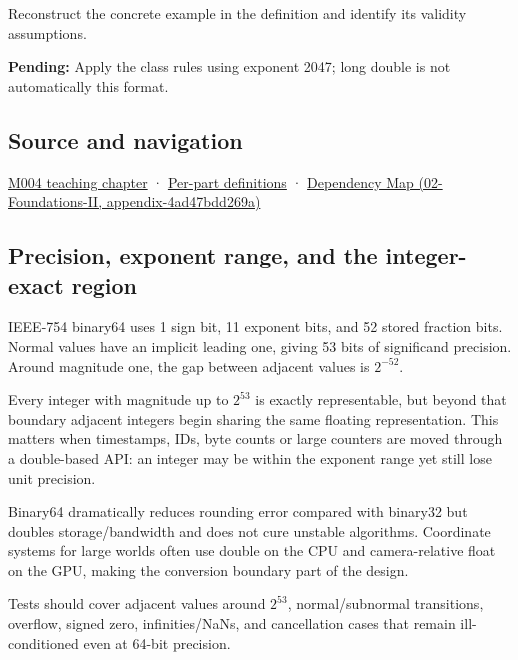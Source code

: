 Reconstruct the concrete example in the definition and identify its validity assumptions.

\textbf{Pending:} Apply the class rules using exponent 2047; long double is not automatically this format.

\subsection{Source and navigation}\label{appendix-5078dfab64e6-source-and-navigation}

\hyperref[01-foundations-i-ch001-a-stretching-ruler-for-real-valued-quantities]{M004 teaching chapter} · \hyperref[appendix-fd090d982a15-m004---parts-61-76]{Per-part definitions} · \href{../02-Foundations-II/main.pdf\#nameddest=appendix-4ad47bdd269a}{Dependency Map (02-Foundations-II, appendix-4ad47bdd269a)}

\subsection{Precision, exponent range, and the integer-exact region}\label{appendix-5078dfab64e6-precision-exponent-range-and-the-integer-exact-region}

IEEE-754 binary64 uses 1 sign bit, 11 exponent bits, and 52 stored fraction bits. Normal values have an implicit leading one, giving 53 bits of significand precision. Around magnitude one, the gap between adjacent values is \(2^{-52}\).

Every integer with magnitude up to \(2^{53}\) is exactly representable, but beyond that boundary adjacent integers begin sharing the same floating representation. This matters when timestamps, IDs, byte counts or large counters are moved through a double-based API: an integer may be within the exponent range yet still lose unit precision.

Binary64 dramatically reduces rounding error compared with binary32 but doubles storage/bandwidth and does not cure unstable algorithms. Coordinate systems for large worlds often use double on the CPU and camera-relative float on the GPU, making the conversion boundary part of the design.

Tests should cover adjacent values around \(2^{53}\), normal/subnormal transitions, overflow, signed zero, infinities/NaNs, and cancellation cases that remain ill-conditioned even at 64-bit precision.
